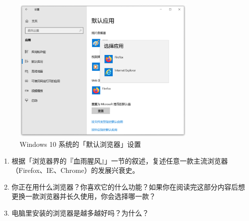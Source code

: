 \begin{figure}[htb!]
  \centering
  \includegraphics[width=9cm]{assets/software/Setting_default_browser.png}
  \caption{Windows 10 系统的「默认浏览器」设置}
  \label{fig:Setting_default_browser}
\end{figure}

\practice

\begin{enumerate}
  \item 根据「浏览器界的『血雨腥风』」一节的叙述，复述任意一款主流浏览器（Firefox、IE、Chrome）的发展兴衰史。
  \item 你正在用什么浏览器？你喜欢它的什么功能？如果你在阅读完这部分内容后想更换一款浏览器并长久使用，你会选择哪一款？
  \item 电脑里安装的浏览器是越多越好吗？为什么？
\end{enumerate}